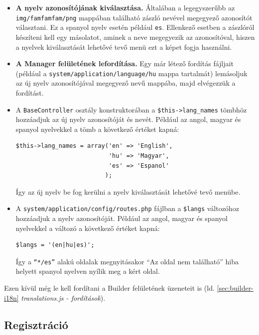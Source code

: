 \documentclass[12pt,a4paper,twoside]{article}
\begin{document}
\begin{itemize}
  \item \textbf{A nyelv azonosítójának kiválasztása.} Általában a legegyszerűbb az
    \texttt{img/famfamfam/png} mappában található zászló nevével megegyező
    azonosítót választani. Ez a spanyol nyelv esetén például
    \texttt{es}. Ellenkező esetben a zászlóról készíteni kell egy
    másolatot, aminek a neve megegyezik az azonosítóval, hiszen a nyelvek
    kiválasztását lehetővé tevő menü ezt a képet fogja használni.
  \item \textbf{A Manager felületének lefordítása.} Egy már létező fordítás fájljait
    (például a \texttt{system/application/language/hu} mappa tartalmát)
    lemásoljuk az új nyelv azonosítójával megegyező nevű mappába, majd
    elvégezzük a fordítást.
  \item A \texttt{BaseController} osztály konstruktorában a
    \texttt{\$this->lang\_names} tömbhöz hozzáadjuk az új nyelv azonosítóját és
    nevét. Például az angol, magyar és spanyol nyelvekkel a tömb a következő
    értéket kapná:
    \begin{lstlisting}[firstnumber=35]
$this->lang_names = array('en' => 'English',
                          'hu' => 'Magyar',
                          'es' => 'Espanol'
                         );
    \end{lstlisting}
    Így az új nyelv be fog kerülni a nyelv kiválasztását lehetővé tevő menübe.
  \item A \texttt{system/application/config/routes.php} fájlban a
    \texttt{\$langs} változóhoz hozzáadjuk a nyelv azonosítóját. Például az
    angol, magyar és spanyol nyelvekkel a változó a következő értéket kapná:
    \begin{lstlisting}[firstnumber=46]
$langs = '(en|hu|es)';
    \end{lstlisting}
    Így a \texttt{``*/es''} alakú oldalak megnyitásakor ``Az oldal nem található''
    hiba helyett spanyol nyelven nyílik meg a kért oldal.

\end{itemize}

Ezen kívül még le kell fordítani a Builder felületének üzeneteit is (ld.
\ref{sec:builder-i18n} \textit{translations.js - fordítások}).

\subsection{Regisztráció}
\label{sec:reg_check}
\end{document}
